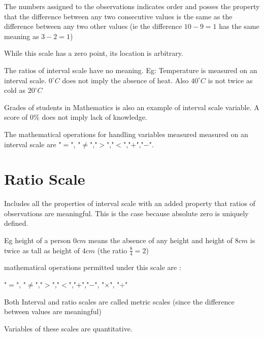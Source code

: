 The numbers assigned to the observations indicates order and posses the property that the difference between any two consecutive values is the same as the difference between any two other values (ie the difference $10 - 9 = 1$ has the same meaning as $3 - 2 = 1$)

While this scale has a zero point, its location is arbitrary.

The ratios of interval scale have no meaning.
Eg: Temperature is measured on an interval scale. $0^{\circ}C$ does not imply the absence of heat. Also $40^{\circ}C$ is not twice as cold as $20^{\circ}C$

Grades of students in Mathematics is also an example of interval scale variable. A score of $0\%$ does not imply lack of knowledge.

The mathematical operations for handling variables measured measured on an interval scale are "$=$", "$\neq$","$>$","$<$","$+$","$-$".
\section{Ratio Scale}
Includes all the properties of interval scale with an added property that ratios of observations are meaningful. This is the case because absolute zero is uniquely defined.

Eg height of a person $0cm$ means the absence of any height and height of $8cm$ is twice as tall as height of $4cm$ (the ratio $\frac{8}{4} = 2$)

mathematical operations permitted under this scale are :

"$=$", "$\neq$","$>$","$<$","$+$","$-$", "$\times$", "$\div$"

Both Interval and ratio scales are called metric scales (since the difference between values are meaningful)

Variables of these scales are quantitative.
\newpage
